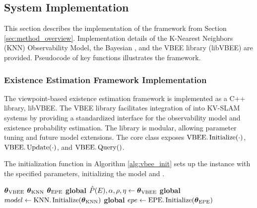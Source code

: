 \subsection{System Implementation}

This section describes the implementation of the \vbee{} framework from Section \ref{sec:method_overview}. Implementation details of the K-Nearest Neighbors (KNN) Observability Model, the Bayesian \epe{}, and the VBEE library (libVBEE) are provided. Pseudocode of key functions illustrates the framework.

\subsubsection{Existence Estimation Framework Implementation}

The viewpoint-based existence estimation framework is implemented as a C++ library, libVBEE. The VBEE library facilitates integration of \vbee{} into KV-SLAM systems by providing a standardized interface for the observability model and existence probability estimation. The library is modular, allowing parameter tuning and future model extensions. The core class exposes \(\text{VBEE}.\operatorname{Initialize}(\cdot)\), \(\text{VBEE}.\operatorname{Update}(\cdot)\), and \(\text{VBEE}.\operatorname{Query}()\).

The initialization function in Algorithm \ref{alg:vbee_init} sets up the \vbee{} instance with the specified parameters, initializing the \knn{} model and \epe{}.

\begin{singlespace}
\begin{algorithm}[H]
    \caption[VBEE Initialization]{VBEE Initialization: $\vbee.\initialize{\params{\vbee}, \params{\knn}, \params{\epe}}$}
    \label{alg:vbee_init}
    \begin{algorithmic}
        \Require $\boldsymbol{\theta}_{\text{VBEE}}$ 
        \Require $\boldsymbol{\theta}_{\text{KNN}}$ 
        \Require $\boldsymbol{\theta}_{\text{EPE}}$ \Comment{$\{\falseneg,\falsepos\}$}
        \State \textbf{global } $\hat{P}(E),\alpha,\rho,\eta \gets \boldsymbol{\theta}_{\text{VBEE}}$ 
        \State \textbf{global } $model \gets \text{KNN}.\operatorname{Initialize}(\boldsymbol{\theta}_{\text{KNN}})$
        \State \textbf{global } $epe \gets \text{EPE}.\operatorname{Initialize}(\boldsymbol{\theta}_{\text{EPE}})$
    \end{algorithmic}
\end{algorithm}
\end{singlespace}

